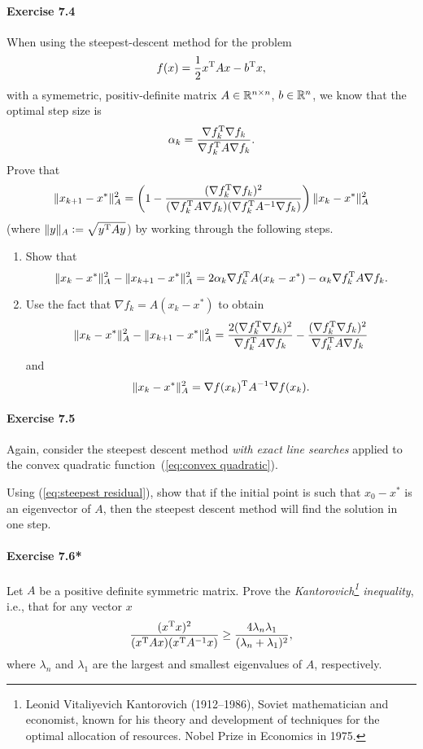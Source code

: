 \paragraph{Exercise 7.4} %
When using the steepest-descent method for the problem
\begin{equation}\label{eq:convex quadratic}
   f(x) = \frac{1}{2} x^{\text{\upshape T}} A x - b^{\text{\upshape T}} x,
\end{equation}
with a symemetric, positiv-definite matrix $A\in\mathbb{R}^{n\times n}$, $b\in\mathbb{R}^n$,
we know that the optimal step size is
\[
  \alpha_k = \frac{\nabla f_k^{\text{\upshape T}} \nabla f_k}{\nabla f_k^{\text{\upshape T}} A \nabla f_k}.
\]
Prove that
\begin{equation}\label{eq:steepest residual}
  \|x_{k+1} - x^*\|_A^2
  = \left(1 - \frac{(\nabla f_k^{\text{\upshape T}}\nabla f_k)^2}{(\nabla f_k^{\text{\upshape T}} A\nabla f_k)(\nabla f_k^{\text{\upshape T}} A^{-1} \nabla f_k)}\right)\|x_{k} - x^*\|_A^2
\end{equation}
(where $\|y\|_A\mathrel{\mathop:}= \sqrt{y^{\text{\upshape T}} Ay}$)
by working through the following steps.
\begin{enumerate}
  \item Show that
\[
  \|x_k - x^*\|_A^2 - \|x_{k+1} - x^*\|_A^2 = 2\alpha_k\nabla f_k^{\text{\upshape T}} A(x_k-x^*) - \alpha_k \nabla f_k^{\text{\upshape T}} A \nabla f_k.
\]
  \item Use the fact that $\nabla f_k = A(x_k - x^*)$ to obtain
    \[
      \|x_k-x^*\|_A^2 - \|x_{k+1}-x^*\|_A^2
      = \frac{2(\nabla f_k^{\text{\upshape T}} \nabla f_k)^2}{\nabla f_k^{\text{\upshape T}} A \nabla f_k} - \frac{(\nabla f_k^{\text{\upshape T}} \nabla f_k)^2}{\nabla f_k^{\text{\upshape T}} A \nabla f_k}
    \]
    and
    \[
      \|x_k-x^*\|_A^2 = \nabla f(x_k)^{\text{\upshape T}} A^{-1} \nabla f(x_k).
    \]
\end{enumerate}


\paragraph{Exercise 7.5} %
Again, consider the steepest descent method \emph{with exact line searches}
applied to the convex quadratic function~(\ref{eq:convex quadratic}).

Using (\ref{eq:steepest residual}), show that if the initial point is such
that $x_0 - x^*$ is an eigenvector of $A$, then the steepest
descent method will find the solution in one step.

\paragraph{Exercise 7.6*}
Let $A$ be a positive definite symmetric matrix. Prove the
\emph{Kantorovich\footnote{Leonid Vitaliyevich Kantorovich (1912--1986),
    Soviet mathematician and economist, known for his theory and development
    of techniques for the optimal allocation of resources. Nobel Prize in
    Economics in 1975.} inequality}, i.e., that for any vector $x$
\[
  \frac{(x^{\text{\upshape T}} x)^2}{(x^{\text{\upshape T}} A x)(x^{\text{\upshape T}} A^{-1}x)}
  \ge \frac{4\lambda_n\lambda_1}{(\lambda_n + \lambda_1)^2},
\]
where $\lambda_n$ and $\lambda_1$ are the largest and smallest eigenvalues of
$A$, respectively.

